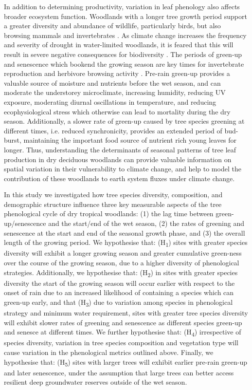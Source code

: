 \begin{refsection}
In addition to determining productivity, variation in leaf phenology also affects broader ecosystem function. Woodlands with a longer tree growth period support a greater diversity and abundance of wildlife, particularly birds, but also browsing mammals and invertebrates \citep{Cole2015, Araujo2017, Morellato2016, Ogutu2013}. As climate change increases the frequency and severity of drought in water-limited woodlands, it is feared that this will result in severe negative consequences for biodiversity \citep{Bale2002}. The periods of green-up and senescence which bookend the growing season are key times for invertebrate reproduction \citep{Prather2012} and herbivore browsing activity \citep{Velasque2016, Morellato2016}. Pre-rain green-up provides a valuable source of moisture and nutrients before the wet season, and can moderate the understorey microclimate, increasing humidity, reducing UV exposure, moderating diurnal oscillations in temperature, and reducing ecophysiological stress which otherwise can lead to mortality during the dry season. Additionally, a slower rate of green-up caused by tree species greening at different times, i.e. reduced synchronicity, provides an extended period of bud-burst, maintaining the important food source of nutrient rich young leaves for longer. Thus, understanding the determinants of seasonal patterns of tree leaf production in dry deciduous woodlands can provide valuable information on spatial variation in their vulnerability to climate change, and help to model the contribution of these woodlands to earth system fluxes under climate change.
 
In this study we investigated how tree species diversity, composition, and demographic structure influence three key measurable aspects of the tree phenological cycle of dry tropical woodlands: (1) the lag time between green-up/senescence and the start/end of the wet season, (2) the rates of greening and senescence at the start and end of the seasonal growth phase, and (3) the overall length of the growing period. We hypothesise that: (H\textsubscript{1}) sites with greater species diversity will exhibit a longer growing season and greater cumulative green-ness over the course of the growing season, due to a higher diversity of phenological strategies. Additionally, we hypothesise that: (H\textsubscript{2}) in sites with greater species diversity the start of the growing season will occur earlier with respect to the onset of rain due to an increased likelihood of containing a species which can green-up early, and that (H\textsubscript{3}) due to variation among species in phenological strategy and minimum water requirement, sites with greater tree species diversity will exhibit slower rates of greening and senescence as different species green-up and senesce at different times. We further hypothesise that: (H\textsubscript{4}) irrespective of species diversity, variation in tree species composition and vegetation type will cause variation in the phenological metrics outlined above. Finally, we hypothesise that: (H\textsubscript{5}) sites with larger trees will exhibit earlier pre-rain green-up and later senescence, under the assumption that large trees can better access resilient deep groundwater reserves outside of the wet season.


\end{refsection}
